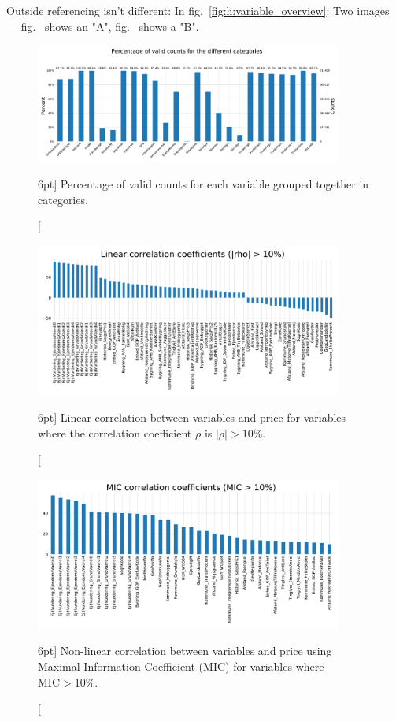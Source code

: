 \documentclass[a4paper, twoside]{tufte-book}
\begin{document}
Outside referencing isn't different: In fig.~\ref{fig:h:variable_overview}: Two images --- fig.~ shows an "A", fig.~ shows a "B".



\begin{figure}
  \includegraphics[width=0.9\textwidth, trim=0 0 0 40, clip]{figures/housing/missing_bar.pdf}
  \caption[Percentage of valid counts for each variable][6pt]
          {Percentage of valid counts for each variable grouped together in categories.}
  \label{fig:h:nans}
\end{figure}


\begin{figure}
  \includegraphics[width=0.9\textwidth, trim=0 0 0 40, clip]{figures/housing/lin_correlation.pdf}
  \caption[Linear correlation between variables and price][6pt]
          {Linear correlation between variables and price for variables where the correlation coefficient $\rho$ is $|\rho| > 10\%$.}
  \label{fig:h:corr_lin}
\end{figure}

\begin{figure}
  \includegraphics[width=0.9\textwidth, trim=0 0 0 40, clip]{figures/housing/MIC_plot.pdf}
  \caption[Non-linear correlation between variables and price][6pt]
          {Non-linear correlation between variables and price using Maximal Information Coefficient (MIC) for variables where $\text{MIC}>10\%$.}
  \label{fig:h:corr_MIC}
\end{figure}
\end{document}
